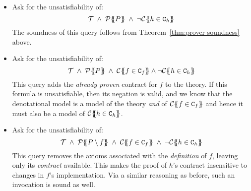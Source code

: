 \begin{itemize}
  \item Ask for the unsatisfiability of:
    \[  \Th\; \land \; \ptrans{\Sigma}{P} \; \land \;\neg\ctrans{\Sigma}{P}{h \in \Ct_h} \]
        The soundness of this query follows from Theorem~\ref{thm:prover-soundness} above.

  \item Ask for the unsatisfiability of:
    \[  \Th \; \land\; \ptrans{\Sigma}{P} \; \land \; \ctrans{\Sigma}{P}{f \in \Ct_f} \land \neg \ctrans{\Sigma}{P}{h \in \Ct_h} \]
        This query adds the {\em already proven} contract for $f$ to the theory. If this formula
        is unsatisfiable, then its negation is valid, and we know that the denotational model is
        a model of the theory {\em and} of $\ctrans{\Sigma}{P}{f \in \Ct_f}$ and hence it must also
        be a model of $\ctrans{\Sigma}{P}{h \in \Ct_h}$.
  \item Ask for the unsatisfiability of:
    \[  \Th \; \land \;
        \ptrans{\Sigma}{P \setminus f} \; \land \;
        \ctrans{\Sigma}{P}{f \in \Ct_f} \; \land \;
        \neg\ctrans{\Sigma}{P}{h \in \Ct_h} \]
        This query removes the axioms associated with the \emph{definition} of $f$, leaving
        only its \emph{contract} available.  This makes the proof of $h$'s contract
        insensitive to changes in $f$'s implementation.
        Via a similar reasoning as before, such an invocation
        is sound as well.
\end{itemize}



